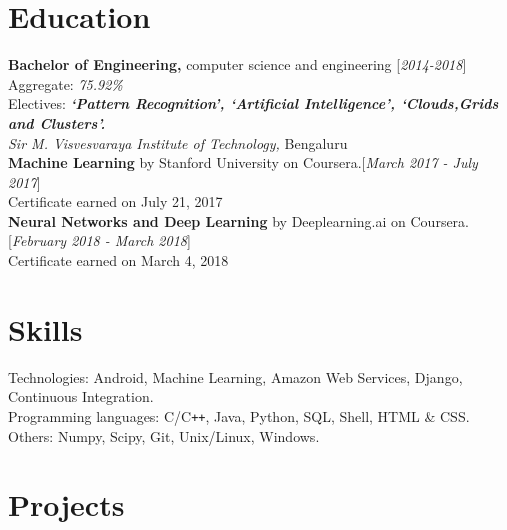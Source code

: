\documentclass[10pt]{article}
\renewcommand{\textbf}[1]{{\bfseries\color{accent_darkest}#1}}
\begin{document}
\section*{Education} \textbf{Bachelor of Engineering,} computer science
and engineering \hfill \textcolor{grey_darker}{[\textit{2014-2018}]}\\
Aggregate: \textit{75.92\%}\\
Electives: \textbf{\textit{`Pattern Recognition', `Artificial Intelligence',
`Clouds,Grids and Clusters'.}}\\
\textit{Sir M. Visvesvaraya Institute of Technology,} Bengaluru
\medskip
\\
\textbf{Machine Learning} by Stanford University on Coursera.\hfill  \textcolor{grey_darker}{[\textit
{March 2017 - July 2017}]}\\
Certificate earned on July 21, 2017
\medskip\\ 
\textbf{Neural Networks and Deep Learning} by Deeplearning.ai on Coursera.\hfill  \textcolor{grey_darker}{[\textit
{February 2018 - March 2018}]}\\
Certificate earned on March 4, 2018 

\section*{Skills} Technologies: Android, Machine Learning, Amazon Web
Services, Django, Continuous Integration.\\
Programming languages: C/C\texttt{++}, Java, Python, SQL, Shell,
HTML \& CSS.\\
Others: Numpy, Scipy, Git, Unix/Linux, Windows. 

\section*{Projects}
\end{document}
